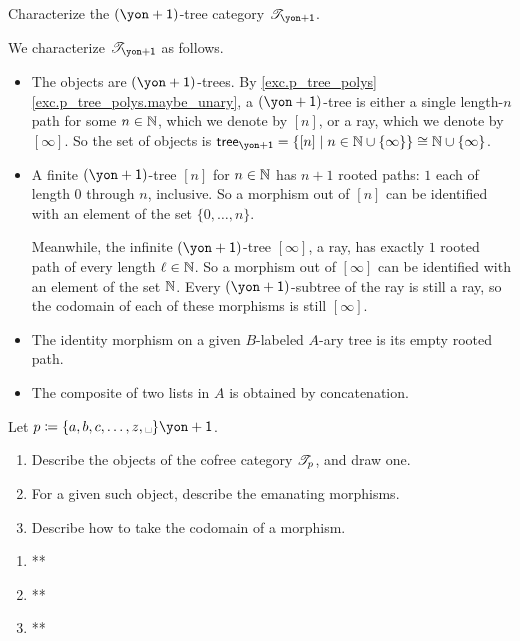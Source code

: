 \documentclass[Book-Poly]{subfiles}
\begin{document}
\begin{exercise}
Characterize the $\left(\yon+\1\right)$-tree category $\cofree{\yon+\1}$.
\begin{solution}
We characterize $\cofree{\yon+\1}$ as follows.
\begin{itemize}
    \item The objects are $(\yon+\1)$-trees.
    By \cref{exc.p_tree_polys} \cref{exc.p_tree_polys.maybe_unary}, a $(\yon+\1)$-tree is either a single length-$n$ path for some $n\in\mathbb{N}$, which we denote by $[n]$, or a ray, which we denote by $[\infty]$.
    So the set of objects is $\tr_{\yon+\1}=\{[n]\mid n\in\nn\cup\{\infty\}\}\iso\nn\cup\{\infty\}$.
    \item A finite $(\yon+\1)$-tree $[n]$ for $n\in\mathbb{N}$ has $n+1$ rooted paths: $1$ each of length $0$ through $n$, inclusive.
    So a morphism out of $[n]$ can be identified with an element of the set $\{0,\ldots,n\}$.
    
    Meanwhile, the infinite $(\yon+\1)$-tree $[\infty]$, a ray, has exactly $1$ rooted path of every length $\ell\in\mathbb{N}$.
    So a morphism out of $[\infty]$ can be identified with an element of the set $\mathbb{N}$.
    Every $(\yon+\1)$-subtree of the ray is still a ray, so the codomain of each of these morphisms is still $[\infty]$.
    \item The identity morphism on a given $B$-labeled $A$-ary tree is its empty rooted path.
    \item The composite of two lists in $A$ is obtained by concatenation.
\end{itemize}
\end{solution}
\end{exercise}

\begin{exercise}
Let $p\coloneqq \{a,b,c,\ldots,z,\text{\textvisiblespace}\}\yon+\1$.
\begin{enumerate}
	\item Describe the objects of the cofree category $\mathscr{T}_{p}$, and draw one.
	\item For a given such object, describe the emanating morphisms.
	\item Describe how to take the codomain of a morphism.
\qedhere
\end{enumerate}
\begin{solution}
\begin{enumerate}
    \item **
    \item **
    \item **
\end{enumerate}
\end{solution}
\end{exercise}
\end{document}
